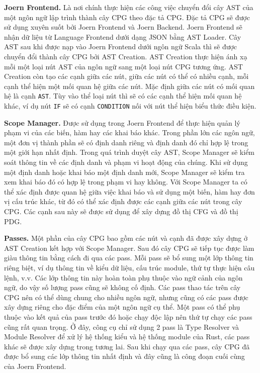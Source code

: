 \textbf{Joern Frontend.} Là nơi chính thực hiện các công việc chuyển đổi cây AST của một ngôn ngữ lập trình thành cây CPG theo đặc tả CPG.
Đặc tả CPG sẽ được sử dụng xuyên suốt bởi Joern Frontend và Joern Backend.
Joern Frontend sẽ nhận dữ liệu từ Language Frontend dưới dạng JSON bằng AST Loader.
Cây AST sau khi được nạp vào Joern Frontend dưới ngôn ngữ Scala thì sẽ được chuyển đổi thành cây CPG bởi AST Creation.
AST Creation thực hiện ánh xạ mỗi một loại nút AST của ngôn ngữ sang một loại nút CPG tương ứng.
AST Creation còn tạo các cạnh giữa các nút, giữa các nút có thể có nhiều cạnh, mỗi cạnh thể hiện một mối quan hệ giữa các nút.
Mặc định giữa các nút có mối quan hệ là cạnh \texttt{AST}.
Tùy vào thể loại nút thì sẽ có các cạnh thể hiện mối quan hệ khác, ví dụ nút \texttt{IF} sẽ có cạnh \texttt{CONDITION} nối với nút thể hiện biểu thức điều kiện.

\textbf{Scope Manager.} Được sử dụng trong Joern Frontend để thực hiện quản lý phạm vi của các biến, hàm hay các khai báo khác.
Trong phần lớn các ngôn ngữ, một đơn vị thành phần sẽ có định danh riêng và định danh đó chỉ hợp lệ trong một giới hạn nhất định.
Trong quá trình duyệt cây AST, Scope Manager sẽ kiểm soát thông tin về các định danh và phạm vi hoạt động của chúng.
Khi sử dụng một định danh hoặc khai báo một định danh mới, Scope Manager sẽ kiểm tra xem khai báo đó có hợp lệ trong phạm vi hay không.
Với Scope Manager ta có thể xác định được quan hệ giữa việc khai báo và sử dụng một biến, hàm hay đơn vị cấu trúc khác, từ đó có thể xác định được các cạnh giữa các nút trong cây CPG.
Các cạnh sau này sẽ được sử dụng để xây dựng đồ thị CFG và đồ thị PDG.

\textbf{Passes.} Một phần của cây CPG bao gồm các nút và cạnh đã được xây dựng ở AST Creation kết hợp với Scope Manager.
Sau đó cây CPG sẽ tiếp tục được làm giàu thông tin bằng cách đi qua các pass.
Mỗi pass sẽ bổ sung một lớp thông tin riêng biệt, ví dụ thông tin về kiểu dữ liệu, cấu trúc module, thứ tự thực hiện câu lệnh, v.v.
Các lớp thông tin này hoàn toàn phụ thuộc vào ngữ cảnh của ngôn ngữ, do vậy số lượng pass cũng sẽ không cố định.
Các pass thao tác trên cây CPG nên có thể dùng chung cho nhiều ngôn ngữ, nhưng cũng có các pass được xây dựng riêng cho đặc điểm của một ngôn ngữ cụ thể.
Một pass có thể phụ thuộc vào kết quả của pass trước đó hoặc chạy độc lập nên thứ tự chạy các pass cũng rất quan trọng.
Ở đây, công cụ chỉ sử dụng 2 pass là Type Resolver và Module Resolver để xử lý hệ thống kiểu và hệ thống module của Rust, các pass khác sẽ được xây dựng trong tương lai.
Sau khi chạy qua các pass, cây CPG đã được bổ sung các lớp thông tin nhất định và đây cũng là công đoạn cuối cùng của Joern Frontend.


